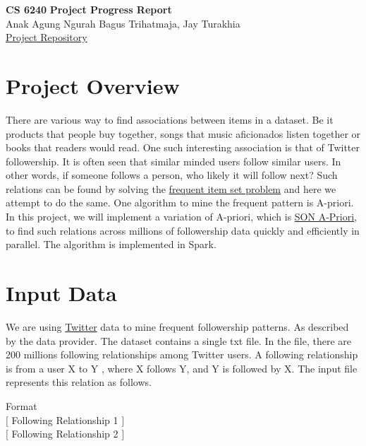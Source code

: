 \documentclass[11pt]{article}
\begin{document}
\thispagestyle{empty}
\setlength{\parindent}{0pt}
\setlength{\parskip}{1.8ex}
\lstset{language=Scala}
\newcommand{\hs}{\hspace{.1in}}

\begin{center}
    \Large{\bf CS 6240}
    \Large{\bf Project Progress Report\\}
    \Large{Anak Agung Ngurah Bagus Trihatmaja, Jay Turakhia\\}
    \href{https://github.ccs.neu.edu/prdx/CS6240-Project}{Project Repository}  \\
\end{center}
\medskip

\section{Project Overview}
There are various way to find associations between items in a dataset.
Be it products that people buy together, songs that music aficionados listen together or books that readers would read.
One such interesting association is that of Twitter followership.
It is often seen that similar minded users follow similar users.
In other words, if someone follows a person, who likely it will follow next?
Such relations can be found by solving the \href{https://en.wikipedia.org/wiki/Association_rule_learning}{frequent item set problem} and here we attempt to do the same.
One algorithm to mine the frequent pattern is A-priori.
In this project, we will implement a variation of A-priori, which is \href{http://www.vldb.org/conf/1995/P432.PDF}{SON A-Priori}, to find such relations across millions of followership data quickly and efficiently in parallel.
The algorithm is implemented in Spark.

\section{Input Data}
We are using \href{https://wiki.illinois.edu//wiki/display/forward/Dataset-UDI-TwitterCrawl-Aug2012}{Twitter} data to mine frequent followership patterns.
As described by the data provider.
The dataset contains a single txt file.
In the file, there are 200 millions following relationships among Twitter users.
A following relationship is from a user X to Y , where X follows Y, and Y is followed by X.
The input file represents this relation as follows.

Format\\
$\big[$ Following Relationship 1 $\big]$\\
$\big[$ Following Relationship 2 $\big]$\\
\end{document}
